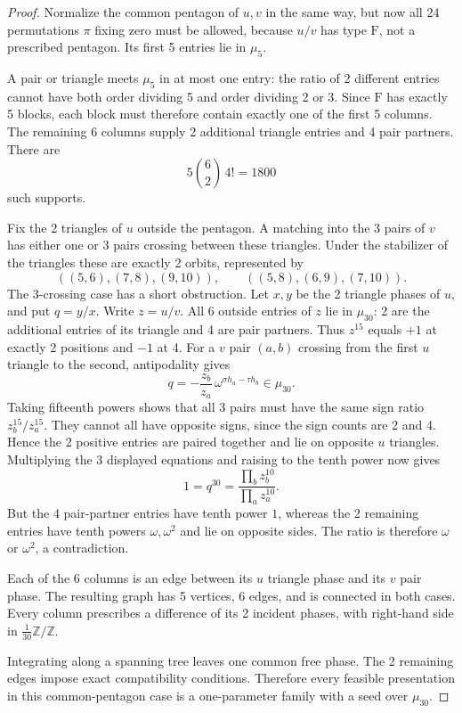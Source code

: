 \documentclass[11pt,a4paper]{article}
\theoremstyle{plain}
\theoremstyle{definition}
\theoremstyle{plain}
\begin{document}
\begin{proof}
Normalize the common pentagon of $u,v$ in the same way, but now all $24$ permutations $\pi$ fixing zero must be allowed, because $u/v$ has type $\mathrm{F}$, not a prescribed pentagon. Its first 5 entries lie in $\mu_5$.

A pair or triangle meets $\mu_5$ in at most one entry: the ratio of 2 different entries cannot have both order dividing 5 and order dividing 2 or 3. Since $\mathrm{F}$ has exactly 5 blocks, each block must therefore contain exactly one of the first 5 columns. The remaining 6 columns supply 2 additional triangle entries and 4 pair partners. There are
$$5\binom62\,4!=1800$$
such supports.

Fix the 2 triangles of $u$ outside the pentagon. A matching into the 3 pairs of $v$ has either one or 3 pairs crossing between these triangles. Under the stabilizer of the triangles these are exactly 2 orbits, represented by
$$((5,6),(7,8),(9,10)),\qquad ((5,8),(6,9),(7,10)).$$
The 3-crossing case has a short obstruction. Let $x,y$ be the 2 triangle phases of $u$, and put $q=y/x$. Write $z=u/v$. All 6 outside entries of $z$ lie in $\mu_{30}$: 2 are the additional entries of its triangle and 4 are pair partners. Thus $z^{15}$ equals $+1$ at exactly 2 positions and $-1$ at 4. For a $v$ pair $(a,b)$ crossing from the first $u$ triangle to the second, antipodality gives
$$q=-\frac{z_b}{z_a}\,\omega^{\sigma h_a-\tau h_b}\in\mu_{30}.$$
Taking fifteenth powers shows that all 3 pairs must have the same sign ratio $z_b^{15}/z_a^{15}$. They cannot all have opposite signs, since the sign counts are 2 and 4. Hence the 2 positive entries are paired together and lie on opposite $u$ triangles. Multiplying the 3 displayed equations and raising to the tenth power now gives
$$1=q^{30}=\frac{\prod_b z_b^{10}}{\prod_a z_a^{10}}.$$
But the 4 pair-partner entries have tenth power $1$, whereas the 2 remaining entries have tenth powers $\omega,\omega^2$ and lie on opposite sides. The ratio is therefore $\omega$ or $\omega^2$, a contradiction.

Each of the 6 columns is an edge between its $u$ triangle phase and its $v$ pair phase. The resulting graph has 5 vertices, 6 edges, and is connected in both cases. Every column prescribes a difference of its 2 incident phases, with right-hand side in $\tfrac1{30}\mathbb Z/\mathbb Z$.

Integrating along a spanning tree leaves one common free phase. The 2 remaining edges impose exact compatibility conditions. Therefore every feasible presentation in this common-pentagon case is a one-parameter family with a seed over $\mu_{30}$.


\end{proof}
\end{document}
